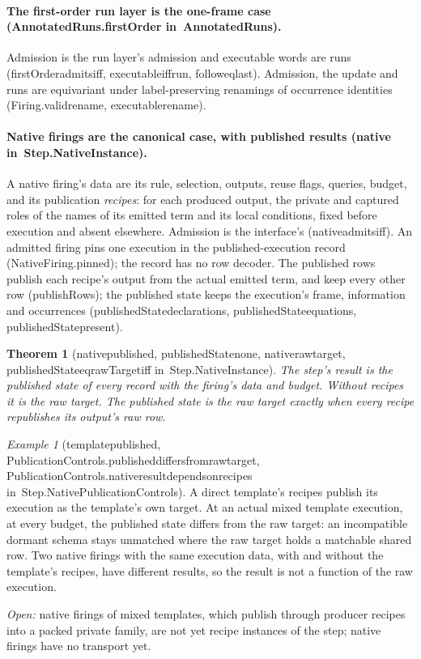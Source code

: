 \documentclass[11pt]{article}
\newtheorem{theorem}{Theorem}
\theoremstyle{remark}
\newtheorem{example}{Example}
\newcommand{\lean}[1]{{\ttfamily\def\_{\textunderscore\allowbreak}#1}}
\newcommand{\inmod}[1]{in~{\ttfamily\def\_{\textunderscore\allowbreak}#1}}
\begin{document}
\paragraph{The first-order run layer is the one-frame case (\lean{AnnotatedRuns.firstOrder} \inmod{AnnotatedRuns}).}
Admission is the run layer's admission and executable words are runs (\lean{firstOrder\_admits\_iff},
\lean{executable\_iff\_run}, \lean{follow\_eq\_last}). Admission, the update and runs are equivariant under
label-preserving renamings of occurrence identities (\lean{Firing.valid\_rename}, \lean{executable\_rename}).

\paragraph{Native firings are the canonical case, with published results (\lean{native} \inmod{Step.NativeInstance}).}
A native firing's data are its rule, selection, outputs, reuse flags, queries, budget, and its
publication \emph{recipes}: for each produced output, the private and captured roles of the names of
its emitted term and its local conditions, fixed before execution and absent elsewhere. Admission is the
interface's (\lean{native\_admits\_iff}). An admitted firing pins one execution in the published-execution
record (\lean{NativeFiring.pinned}); the record has no row decoder. The published rows publish each
recipe's output from the actual emitted term, and keep every other row (\lean{publishRows}); the published
state keeps the execution's frame, information and occurrences (\lean{publishedState\_declarations},
\lean{publishedState\_equations}, \lean{publishedState\_present}).

\begin{theorem}[\lean{native\_published}, \lean{publishedState\_none}, \lean{native\_raw\_target}, \lean{publishedState\_eq\_rawTarget\_iff} \inmod{Step.NativeInstance}]
The step's result is the published state of every record with the firing's data and budget. Without
recipes it is the raw target. The published state is the raw target exactly when every recipe
republishes its output's raw row.
\end{theorem}

\begin{example}[\lean{template\_published}, \lean{PublicationControls.published\_differs\_from\_raw\_target}, \lean{PublicationControls.native\_result\_depends\_on\_recipes} \inmod{Step.NativePublicationControls}]
A direct template's recipes publish its execution as the template's own target. At an actual mixed
template execution, at every budget, the published state differs from the raw target: an incompatible
dormant schema stays unmatched where the raw target holds a matchable shared row. Two native firings with
the same execution data, with and without the template's recipes, have different results, so the result
is not a function of the raw execution.
\end{example}
\emph{Open:} native firings of mixed templates, which publish through producer recipes into a packed
private family, are not yet recipe instances of the step; native firings have no transport yet.
\end{document}

